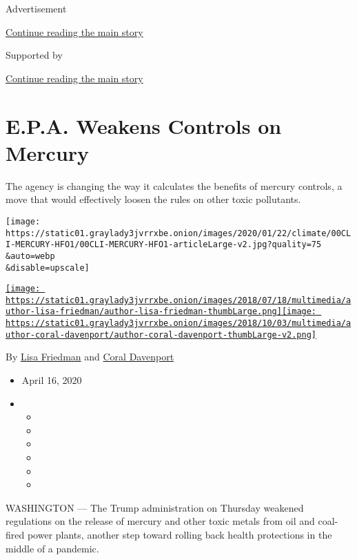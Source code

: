 Advertisement

\protect\hyperlink{after-top}{Continue reading the main story}

Supported by

\protect\hyperlink{after-sponsor}{Continue reading the main story}

\hypertarget{epa-weakens-controls-on-mercury}{%
\section{E.P.A. Weakens Controls on
Mercury}\label{epa-weakens-controls-on-mercury}}

The agency is changing the way it calculates the benefits of mercury
controls, a move that would effectively loosen the rules on other toxic
pollutants.

\texttt{[image: https://static01.graylady3jvrrxbe.onion/images/2020/01/22/climate/00CLI-MERCURY-HFO1/00CLI-MERCURY-HFO1-articleLarge-v2.jpg?quality=75\\\&auto=webp\\\&disable=upscale]}

\href{https://www.nytimes3xbfgragh.onion/by/lisa-friedman}{\texttt{[image: https://static01.graylady3jvrrxbe.onion/images/2018/07/18/multimedia/author-lisa-friedman/author-lisa-friedman-thumbLarge.png]}}\href{https://www.nytimes3xbfgragh.onion/by/coral-davenport}{\texttt{[image: https://static01.graylady3jvrrxbe.onion/images/2018/10/03/multimedia/author-coral-davenport/author-coral-davenport-thumbLarge-v2.png]}}

By \href{https://www.nytimes3xbfgragh.onion/by/lisa-friedman}{Lisa
Friedman} and
\href{https://www.nytimes3xbfgragh.onion/by/coral-davenport}{Coral
Davenport}

\begin{itemize}
\item
  April 16, 2020
\item
  \begin{itemize}
  \item
  \item
  \item
  \item
  \item
  \item
  \end{itemize}
\end{itemize}

WASHINGTON --- The Trump administration on Thursday weakened regulations
on the release of mercury and other toxic metals from oil and coal-fired
power plants, another step toward rolling back health protections in the
middle of a pandemic.

